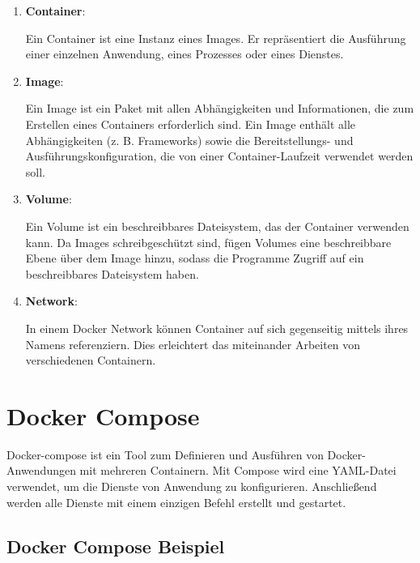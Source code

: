 \begin{enumerate}
    \item \textbf{Container}:
    
    Ein Container ist eine Instanz eines Images. Er repräsentiert die Ausführung einer einzelnen Anwendung, eines Prozesses oder eines Dienstes. 

    \item \textbf{Image}:
    
    Ein Image ist ein Paket mit allen Abhängigkeiten und Informationen, die zum Erstellen eines Containers erforderlich sind. Ein Image enthält alle Abhängigkeiten (z. B. Frameworks) sowie die Bereitstellungs- und Ausführungskonfiguration, die von einer Container-Laufzeit verwendet werden soll. 

    \item \textbf{Volume}:
    
    Ein Volume ist ein beschreibbares Dateisystem, das der Container verwenden kann. Da Images schreibgeschützt sind, fügen Volumes eine beschreibbare Ebene über dem Image hinzu, sodass die Programme Zugriff auf ein beschreibbares Dateisystem haben. 

    \item \textbf{Network}:

    In einem Docker Network können Container auf sich gegenseitig mittels ihres Namens referenziern. Dies erleichtert das miteinander Arbeiten von verschiedenen Containern.
\end{enumerate}

\section{Docker Compose}\label{sec:docker-compose}

Docker-compose ist ein Tool zum Definieren und Ausführen von Docker-Anwendungen mit mehreren Containern. Mit Compose wird eine YAML-Datei verwendet, um die Dienste von Anwendung zu konfigurieren. Anschließend werden alle Dienste mit einem einzigen Befehl erstellt und gestartet. \cite{docker_compose_description}

\subsection{Docker Compose Beispiel}

